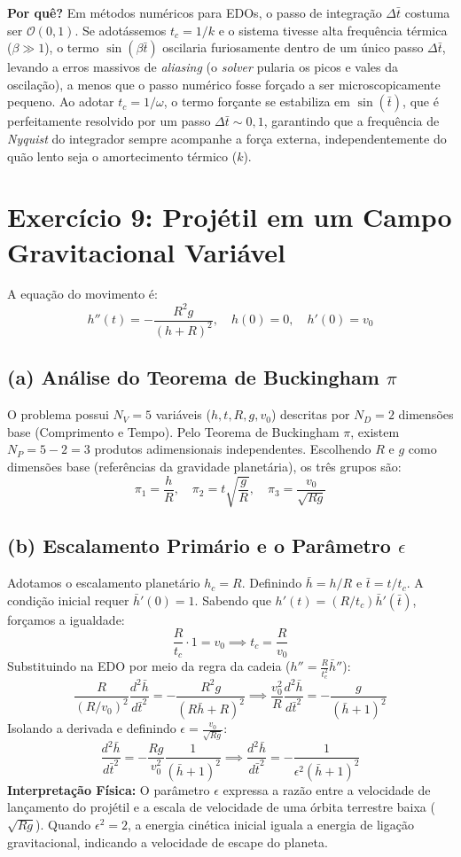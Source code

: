 \documentclass{article}
\begin{document}
\textbf{Por quê?} Em métodos numéricos para EDOs, o passo de integração $\Delta \bar{t}$ costuma ser $\mathcal{O}(0,1)$. Se adotássemos $t_c = 1/k$ e o sistema tivesse alta frequência térmica ($\beta \gg 1$), o termo $\sin(\beta \bar{t})$ oscilaria furiosamente dentro de um único passo $\Delta \bar{t}$, levando a erros massivos de \textit{aliasing} (o \textit{solver} pularia os picos e vales da oscilação), a menos que o passo numérico fosse forçado a ser microscopicamente pequeno. Ao adotar $t_c = 1/\omega$, o termo forçante se estabiliza em $\sin(\bar{t})$, que é perfeitamente resolvido por um passo $\Delta \bar{t} \sim 0,1$, garantindo que a frequência de \textit{Nyquist} do integrador sempre acompanhe a força externa, independentemente do quão lento seja o amortecimento térmico ($k$).

\section*{Exercício 9: Projétil em um Campo Gravitacional Variável}

A equação do movimento é:
\[ h''(t) = -\frac{R^2 g}{(h + R)^2}, \quad h(0) = 0, \quad h'(0) = v_0 \]

\subsection*{(a) Análise do Teorema de Buckingham $\pi$}
O problema possui $N_V = 5$ variáveis ($h, t, R, g, v_0$) descritas por $N_D = 2$ dimensões base (Comprimento e Tempo). Pelo Teorema de Buckingham $\pi$, existem $N_P = 5 - 2 = 3$ produtos adimensionais independentes. Escolhendo $R$ e $g$ como dimensões base (referências da gravidade planetária), os três grupos são:
\[ \pi_1 = \frac{h}{R}, \quad \pi_2 = t \sqrt{\frac{g}{R}}, \quad \pi_3 = \frac{v_0}{\sqrt{Rg}} \]

\subsection*{(b) Escalamento Primário e o Parâmetro $\epsilon$}
Adotamos o escalamento planetário $h_c = R$. Definindo $\bar{h} = h/R$ e $\bar{t} = t/t_c$.
A condição inicial requer $\bar{h}'(0) = 1$. Sabendo que $h'(t) = (R/t_c)\bar{h}'(\bar{t})$, forçamos a igualdade:
\[ \frac{R}{t_c} \cdot 1 = v_0 \implies t_c = \frac{R}{v_0} \]
Substituindo na EDO por meio da regra da cadeia ($h'' = \frac{R}{t_c^2}\bar{h}''$):
\[ \frac{R}{(R/v_0)^2} \frac{d^2\bar{h}}{d\bar{t}^2} = -\frac{R^2 g}{(R\bar{h} + R)^2} \implies \frac{v_0^2}{R}\frac{d^2\bar{h}}{d\bar{t}^2} = -\frac{g}{(\bar{h} + 1)^2} \]
Isolando a derivada e definindo $\epsilon = \frac{v_0}{\sqrt{Rg}}$:
\[ \frac{d^2\bar{h}}{d\bar{t}^2} = -\frac{Rg}{v_0^2}\frac{1}{(\bar{h} + 1)^2} \implies \frac{d^2\bar{h}}{d\bar{t}^2} = -\frac{1}{\epsilon^2 (\bar{h} + 1)^2} \]
\textbf{Interpretação Física:} O parâmetro $\epsilon$ expressa a razão entre a velocidade de lançamento do projétil e a escala de velocidade de uma órbita terrestre baixa ($\sqrt{Rg}$). Quando $\epsilon^2 = 2$, a energia cinética inicial iguala a energia de ligação gravitacional, indicando a velocidade de escape do planeta.
\end{document}
